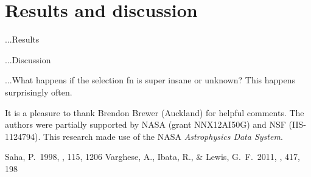 \documentclass[12pt,pdftex,preprint]{aastex}
\begin{document}
\section{Results and discussion}

...Results

...Discussion

...What happens if the selection fn is super insane or unknown?  This
happens surprisingly often.

\acknowledgements It is a pleasure to thank
  Brendon Brewer (Auckland)
for helpful comments.  The authors were partially supported by NASA
(grant NNX12AI50G) and NSF (IIS-1124794).  This research made use of
the NASA \textsl{Astrophysics Data System}.

\begin{thebibliography}{}
Saha, P.\ 1998, \aj, 115, 1206 
Varghese, A., Ibata, R., \& Lewis, G.~F.\ 2011, \mnras, 417, 198 
\end{thebibliography}
\end{document}
